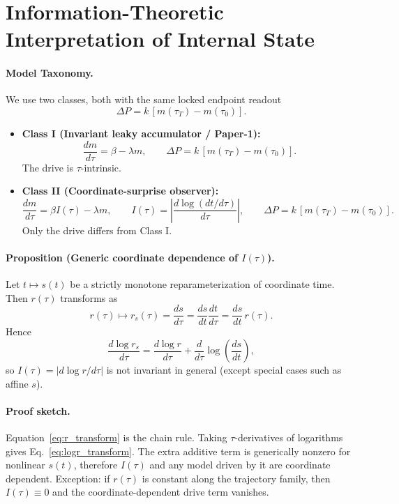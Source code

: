 ﻿\section{Information-Theoretic Interpretation of Internal State}
\label{sec:information_theory}

\paragraph{Model Taxonomy.}
We use two classes, both with the same locked endpoint readout
\[
\Delta P = k\,[m(\tau_T)-m(\tau_0)].
\]
\begin{itemize}
\item \textbf{Class I (Invariant leaky accumulator / Paper-1):}
\[
\frac{dm}{d\tau}=\beta-\lambda m,\qquad
\Delta P = k\,[m(\tau_T)-m(\tau_0)].
\]
The drive is $\tau$-intrinsic.
\item \textbf{Class II (Coordinate-surprise observer):}
\[
\frac{dm}{d\tau}=\beta I(\tau)-\lambda m,\qquad
I(\tau)=\left|\frac{d\log(dt/d\tau)}{d\tau}\right|,\qquad
\Delta P = k\,[m(\tau_T)-m(\tau_0)].
\]
Only the drive differs from Class I.
\end{itemize}

\paragraph{Proposition (Generic coordinate dependence of $I(\tau)$).}
Let $t\mapsto s(t)$ be a strictly monotone reparameterization of coordinate time. Then $r(\tau)$ transforms as
\begin{equation}
r(\tau)\mapsto r_s(\tau)=\frac{ds}{d\tau}=\frac{ds}{dt}\frac{dt}{d\tau}=\frac{ds}{dt}\,r(\tau).
\label{eq:r_transform}
\end{equation}
Hence
\begin{equation}
\frac{d\log r_s}{d\tau}
=
\frac{d\log r}{d\tau}
+
\frac{d}{d\tau}\log\!\left(\frac{ds}{dt}\right),
\label{eq:logr_transform}
\end{equation}
so $I(\tau)=|d\log r/d\tau|$ is not invariant in general (except special cases such as affine $s$).

\paragraph{Proof sketch.}
Equation~\eqref{eq:r_transform} is the chain rule. Taking $\tau$-derivatives of logarithms gives Eq.~\eqref{eq:logr_transform}. The extra additive term is generically nonzero for nonlinear $s(t)$, therefore $I(\tau)$ and any model driven by it are coordinate dependent.
Exception: if $r(\tau)$ is constant along the trajectory family, then $I(\tau)\equiv 0$ and the coordinate-dependent drive term vanishes.

